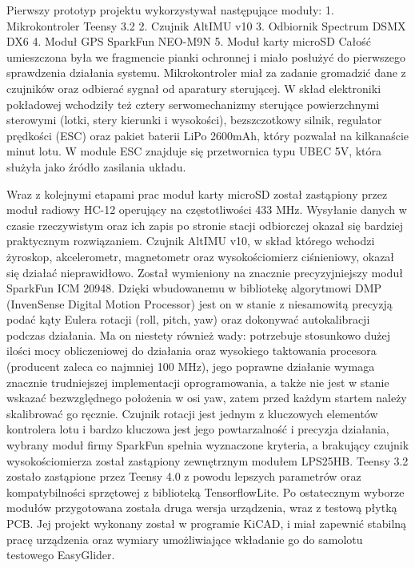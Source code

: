 \documentclass[12pt, a4paper]{article}
\begin{document}
Pierwszy prototyp projektu wykorzystywał następujące moduły:
1.	Mikrokontroler Teensy 3.2
2.	Czujnik AltIMU v10
3.	Odbiornik Spectrum DSMX DX6
4.	Moduł GPS SparkFun NEO-M9N
5.	Moduł karty microSD
Całość umieszczona była we fragmencie pianki ochronnej i miało posłużyć do pierwszego sprawdzenia działania systemu. Mikrokontroler miał za zadanie gromadzić dane z czujników oraz odbierać sygnał od aparatury sterującej. W skład elektroniki pokładowej wchodziły też cztery serwomechanizmy sterujące powierzchnymi sterowymi (lotki, stery kierunki i wysokości), bezszczotkowy silnik, regulator prędkości (ESC) oraz pakiet baterii LiPo 2600mAh, który pozwalał na kilkanaście minut lotu. W module ESC znajduje się przetwornica typu UBEC 5V, która służyła jako źródło zasilania układu.
 
Wraz z kolejnymi etapami prac moduł karty microSD został zastąpiony przez moduł radiowy HC-12 operujący na częstotliwości 433 MHz. Wysyłanie danych w czasie rzeczywistym oraz ich zapis po stronie stacji odbiorczej okazał się bardziej praktycznym rozwiązaniem. Czujnik AltIMU v10, w skład którego wchodzi żyroskop, akcelerometr, magnetometr oraz wysokościomierz ciśnieniowy, okazał się działać nieprawidłowo. Został wymieniony na znacznie precyzyjniejszy moduł SparkFun ICM 20948. Dzięki wbudowanemu w bibliotekę algorytmowi DMP (InvenSense Digital Motion Processor) jest on w stanie z niesamowitą precyzją podać kąty Eulera rotacji (roll, pitch, yaw) oraz dokonywać autokalibracji podczas działania. Ma on niestety również wady: potrzebuje stosunkowo dużej ilości mocy obliczeniowej do działania oraz wysokiego taktowania procesora (producent zaleca co najmniej 100 MHz), jego poprawne działanie wymaga znacznie trudniejszej implementacji oprogramowania, a także nie jest w stanie wskazać bezwzględnego położenia w osi yaw, zatem przed każdym startem należy skalibrować go ręcznie. Czujnik rotacji jest jednym z kluczowych elementów kontrolera lotu i bardzo kluczowa jest jego powtarzalność i precyzja działania, wybrany moduł firmy SparkFun spełnia wyznaczone kryteria, a brakujący czujnik wysokościomierza został zastąpiony zewnętrznym modułem LPS25HB. Teensy 3.2 zostało zastąpione przez Teensy 4.0 z powodu lepszych parametrów oraz kompatybilności sprzętowej z biblioteką TensorflowLite.
Po ostatecznym wyborze modułów przygotowana została druga wersja urządzenia, wraz  z testową płytką PCB. Jej projekt wykonany został w programie KiCAD, i miał zapewnić stabilną pracę urządzenia oraz wymiary umożliwiające wkładanie go do samolotu testowego EasyGlider. 
\end{document}
